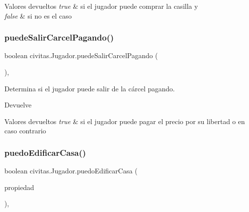 \begin{DoxyRetVals}{Valores devueltos}
{\em true} & si el jugador puede comprar la casilla y \\
\hline
{\em false} & si no es el caso \\
\hline
\end{DoxyRetVals}
\mbox{\label{classcivitas_1_1Jugador_a4a001e328396bc37afa704a71a0f236f}} 
\subsubsection{\texorpdfstring{puede\+Salir\+Carcel\+Pagando()}{puedeSalirCarcelPagando()}}
{\footnotesize\ttfamily boolean civitas.\+Jugador.\+puede\+Salir\+Carcel\+Pagando (\begin{DoxyParamCaption}{ }\end{DoxyParamCaption})\hspace{0.3cm}{\ttfamily [inline]}, {\ttfamily [private]}}

Determina si el jugador puede salir de la cárcel pagando. \begin{DoxyReturn}{Devuelve}

\end{DoxyReturn}

\begin{DoxyRetVals}{Valores devueltos}
{\em true} & si el jugador puede pagar el precio por su libertad o  en caso contrario \\
\hline
\end{DoxyRetVals}
\mbox{\label{classcivitas_1_1Jugador_a471ecc3440579578a91e2eb5cf3a7acc}} 
\subsubsection{\texorpdfstring{puedo\+Edificar\+Casa()}{puedoEdificarCasa()}}
{\footnotesize\ttfamily boolean civitas.\+Jugador.\+puedo\+Edificar\+Casa (\begin{DoxyParamCaption}\item[{\hyperlink{classcivitas_1_1TituloPropiedad}{Titulo\+Propiedad}}]{propiedad }\end{DoxyParamCaption})\hspace{0.3cm}{\ttfamily [inline]}, {\ttfamily [private]}}

